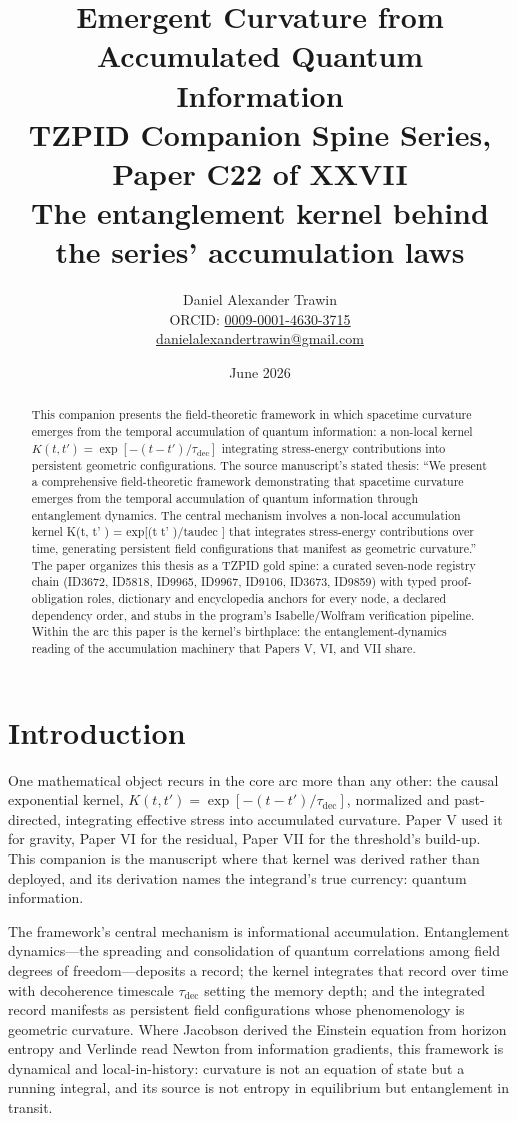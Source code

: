 \documentclass[11pt]{article}
\title{Emergent Curvature from Accumulated Quantum Information\\[0.6em]
\large TZPID Companion Spine Series, Paper C22 of XXVII\\
\normalsize The entanglement kernel behind the series' accumulation laws}
\author{Daniel Alexander Trawin\\
\small ORCID: \href{https://orcid.org/0009-0001-4630-3715}{0009-0001-4630-3715}\\
\small \href{mailto:danielalexandertrawin@gmail.com}{danielalexandertrawin@gmail.com}}
\date{June 2026}
\theoremstyle{remark}
\begin{document}
\maketitle

\begin{abstract}
This companion presents the field-theoretic framework in which spacetime curvature emerges from the temporal accumulation of quantum information: a non-local kernel $K(t,t') = \exp[-(t-t')/\tau_{\mathrm{dec}}]$ integrating stress-energy contributions into persistent geometric configurations.
The source manuscript's stated thesis: ``We present a comprehensive field-theoretic framework demonstrating that spacetime curvature emerges from the temporal accumulation of quantum information through entanglement dynamics. The central mechanism involves a non-local accumulation kernel K(t, t' ) = exp[(t  t' )/taudec ] that integrates stress-energy contributions over time, generating persistent field configurations that manifest as geometric curvature.'' The paper organizes this thesis as a TZPID gold spine: a curated seven-node registry chain (ID3672, ID5818, ID9965, ID9967, ID9106, ID3673, ID9859) with typed proof-obligation roles, dictionary and encyclopedia anchors for every node, a declared dependency order, and stubs in the program's Isabelle/Wolfram verification pipeline. Within the arc this paper is the kernel's birthplace: the entanglement-dynamics reading of the accumulation machinery that Papers V, VI, and VII share.
\end{abstract}

\section{Introduction}
\label{sec:intro}

One mathematical object recurs in the core arc more than any other: the causal exponential kernel, $K(t, t') = \exp[-(t - t')/\tau_{\mathrm{dec}}]$, normalized and past-directed, integrating effective stress into accumulated curvature. Paper V used it for gravity, Paper VI for the residual, Paper VII for the threshold's build-up. This companion is the manuscript where that kernel was derived rather than deployed, and its derivation names the integrand's true currency: quantum information.

The framework's central mechanism is informational accumulation. Entanglement dynamics---the spreading and consolidation of quantum correlations among field degrees of freedom---deposits a record; the kernel integrates that record over time with decoherence timescale $\tau_{\mathrm{dec}}$ setting the memory depth; and the integrated record manifests as persistent field configurations whose phenomenology is geometric curvature. Where Jacobson derived the Einstein equation from horizon entropy and Verlinde read Newton from information gradients, this framework is dynamical and local-in-history: curvature is not an equation of state but a running integral, and its source is not entropy in equilibrium but entanglement in transit.
\end{document}
